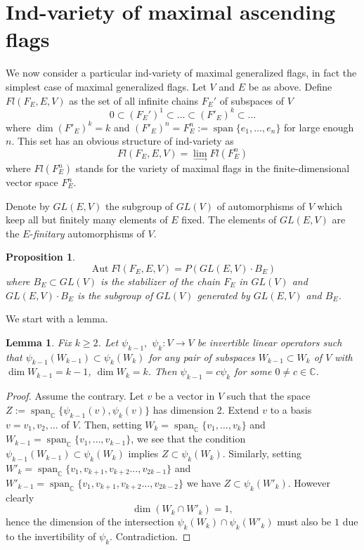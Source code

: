 \documentclass[11pt]{amsart}
\numberwithin{equation}{section}
\theoremstyle{plain}
\newtheorem{prop}{Proposition}
\newtheorem{lemma}{Lemma}
\theoremstyle{remark}
\theoremstyle{remark}
\theoremstyle{construction}
\begin{document}
\section{Ind-variety of  maximal ascending flags}
We now consider a particular ind-variety of maximal generalized flags, in fact the simplest case of maximal generalized flags. Let $V$ and $E$ be as above. Define
$Fl(F_E, E, V)$ as the set of all infinite chains $F_E'$ of subspaces of $V$
$$0\subset(F_E')^1\subset\dots\subset(F'_E)^k\subset\dots$$
where $\operatorname{dim}(F'_E)^k=k$ and $(F'_E)^n= F_E^n:=\operatorname{span}\{e_1,\dots,e_n\}$ for large enough $n$. This set has an obvious structure of ind-variety as
$$Fl(F_E,E,V)=\lim_{\longrightarrow}Fl(F_E^n)$$ 
where $Fl(F_E^n)$ stands for the variety of maximal flags in the finite-dimensional vector space $F_E^n$.

Denote by $GL(E,V)$ the subgroup of $GL(V)$  of automorphisms of $V$ which keep all but finitely many elements of $E$ fixed. The elements of $GL(E,V)$ are the $E$-{\it finitary} automorphisms of $V$.

\begin{prop}
$$\operatorname{Aut}Fl(F_E,E,V)=P(GL(E,V)\cdot B_E)$$
where $B_E\subset GL(V)$ is the stabilizer of the chain $F_E$ in $GL(V)$ and $GL(E,V)\cdot B_E$ is the subgroup of $GL(V)$ generated by $GL(E,V)$ and $B_E$.
\end{prop}

We start with a lemma.

\begin{lemma}
Fix $k\geq2$. Let $\psi_{k-1},$ $ \psi_k:V\to V$ be invertible linear operators such that $\psi_{k-1}(W_{k-1})\subset\psi_k(W_k)$ for any pair of subspaces $W_{k-1}\subset W_k$ of $V$ with $\operatorname{dim}W_{k-1}=k-1$, $\operatorname{dim}W_k=k$. Then $\psi_{k-1}=c\psi_k$ for some $0\neq c\in\mathbb C$.

\end{lemma}

\begin{proof}
Assume the contrary. Let $v$ be a vector in $V$ such that the space  $Z:=\operatorname{span}_{\mathbb{C}}\{\psi_{k-1}(v), \psi_k(v)\}$ has dimension 2. Extend $v$ to a basis $v=v_1,v_2,\dots$ of $V$. Then, setting $W_k=\operatorname{span}_{\mathbb C}\{v_1,\dots, v_k\}$ and $W_{k-1}=\operatorname{span}_{\mathbb C}\{v_1,\dots, v_{k-1}\}$, we see that the condition $\psi_{k-1}(W_{k-1})\subset\psi_k(W_k)$ implies $Z\subset\psi_k(W_k) $. Similarly, setting $W'_{k}=\operatorname{span}_{\mathbb C}\{v_1,v_{k+1}, v_{k+2}\dots,v_{2k-1}\}$ and $W'_{k-1}=\operatorname{span}_{\mathbb C}\{v_1,v_{k+1}, v_{k+2}\dots,v_{2k-2}\}$ we have $Z\subset \psi_k(W'_{k})$.
 However clearly
 $$\operatorname{dim}(W_k \cap W'_k)=1,$$
 hence the dimension of the intersection $\psi_k(W_k)\cap\psi_k(W'_{k})$ must also be $1$ due to the invertibility of $\psi_k$.
Contradiction.







\end{proof} 
\end{document}
